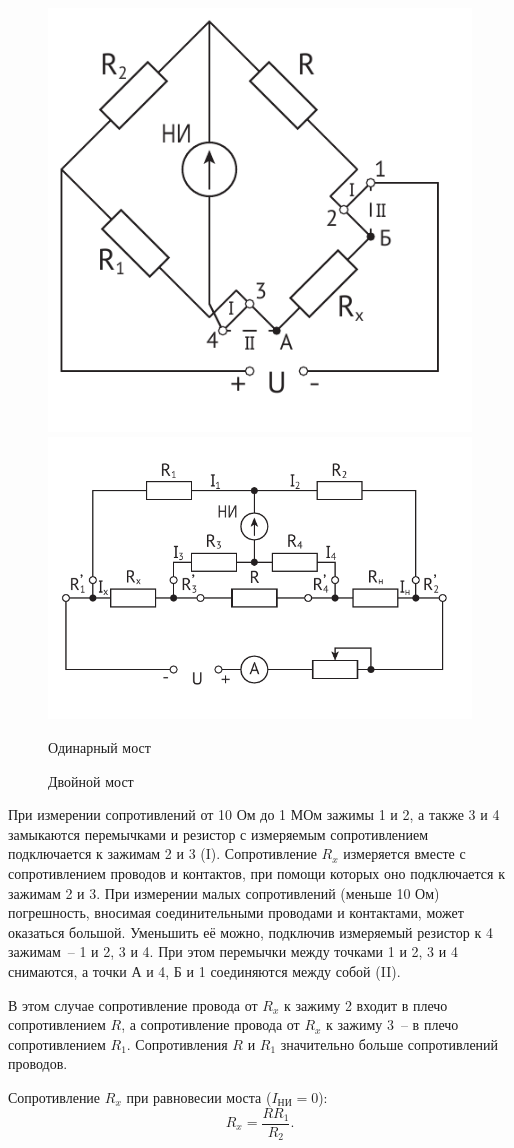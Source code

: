 \documentclass[pscyr]{hedwork}
\begin{document}
  \begin{figure}[!t]
    \center
    \includegraphics[width=.34\textwidth]{current_bridge} \hspace{2em}
    \includegraphics[width=.58\textwidth]{double_bridge} \\
    \parbox{.34\textwidth}{\caption{Одинарный мост} \label{picsinbr}}
      \hspace{2em}
    \parbox{.58\textwidth}{\caption{Двойной мост} \label{picdblbr}}
  \end{figure}

  При измерении сопротивлений от 10 Ом до 1 МОм зажимы 1 и 2, а также 3 и 4
  замыкаются перемычками и резистор с измеряемым сопротивлением подключается к
  зажимам 2 и 3 (I). Сопротивление \( R_x \) измеряется вместе с
  сопротивлением проводов и контактов, при помощи которых оно подключается к
  зажимам 2 и 3. При измерении малых сопротивлений (меньше 10 Ом) погрешность,
  вносимая соединительными проводами и контактами, может оказаться большой.
  Уменьшить её можно, подключив измеряемый резистор к 4 зажимам~-- 1 и 2, 3 и 4.
  При этом перемычки между точками 1 и 2, 3 и 4 снимаются, а точки А и 4, Б и 1
  соединяются между собой (II).

  В этом случае сопротивление провода от \( R_x \) к зажиму 2 входит в плечо
  сопротивлением \( R \), а сопротивление провода от \( R_x \) к зажиму 3~-- в
  плечо сопротивлением \( R_1 \). Сопротивления \( R \) и \( R_1 \) значительно
  больше сопротивлений проводов.

  Сопротивление \( R_x \) при равновесии моста (\( I_\text{НИ} = 0 \)):
  \[
    R_x = \frac{R R_1}{R_2}.
  \]
  
\end{document}
